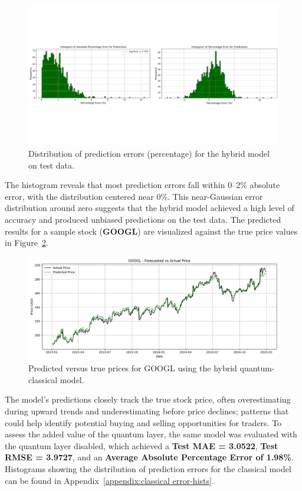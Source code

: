 \documentclass[10pt]{article}
\begin{document}
\begin{figure}[H]
    \centering
    \includegraphics[trim=0cm 7cm 0cm 7.3cm,clip,width=1\linewidth]{images/hybrid prediction errors hists.png}
    \caption{Distribution of prediction errors (percentage) for the hybrid model on test data.}
    \label{fig:hybrid error hists}
\end{figure}

The histogram reveals that most prediction errors fall within 0–2\% absolute error, with the distribution centered near 0\%. This near-Gaussian error distribution around zero suggests that the hybrid model achieved a high level of accuracy and produced unbiased predictions on the test data. The predicted results for a sample stock (\textbf{GOOGL}) are visualized against the true price values in Figure~\ref{fig:Google predictions hybrid}.

\begin{figure}[H]
    \centering
    \includegraphics[trim=0cm 0cm 0cm 0.75cm,clip,width=0.8\linewidth]{images/GOOGL GRU quantum best.png}
    \caption{Predicted versus true prices for GOOGL using the hybrid quantum-classical model.}
    \label{fig:Google predictions hybrid}
\end{figure}

The model's predictions closely track the true stock price, often overestimating during upward trends and underestimating before price declines; patterns that could help identify potential buying and selling opportunities for traders. To assess the added value of the quantum layer, the same model was evaluated with the quantum layer disabled, which achieved a \textbf{Test MAE = 3.0522}, \textbf{Test RMSE = 3.9727}, and an \textbf{Average Absolute Percentage Error of 1.98\%}. Histograms showing the distribution of prediction errors for the classical model can be found in Appendix~\ref{appendix:classical error-hists}.
\end{document}
